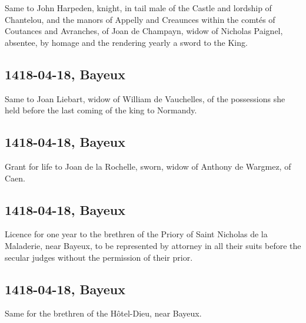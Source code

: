 \documentclass[a4paper,12pt,twoside]{book}
\begin{document}
                
                     Same to John Harpeden, knight, in tail male of the Castle and lordship of Chantelou, and the manors of Appelly and Creaunces within the comtés of Coutances and Avranches, of Joan de Champayn, widow of Nicholas Paignel, absentee, by homage and the rendering yearly a sword to the King.
                  
                
                \subsection{1418-04-18, Bayeux}
                
                
                     Same to Joan Liebart, widow of William de Vauchelles, of the possessions she held before the last coming of the king to Normandy.
                  
                
                \subsection{1418-04-18, Bayeux}
                
                
                     Grant for life to Joan de la Rochelle, sworn, widow of Anthony de Wargmez, of Caen.
                  
                
                \subsection{1418-04-18, Bayeux}
                
                
                     Licence for one year to the brethren of the Priory of Saint Nicholas de la Maladerie, near Bayeux, to be represented by attorney in all their suits before the secular judges without the permission of their prior.
                  
                
                \subsection{1418-04-18, Bayeux}
                
                
                     Same for the brethren of the Hôtel-Dieu, near Bayeux.
                  
                
\end{document}

